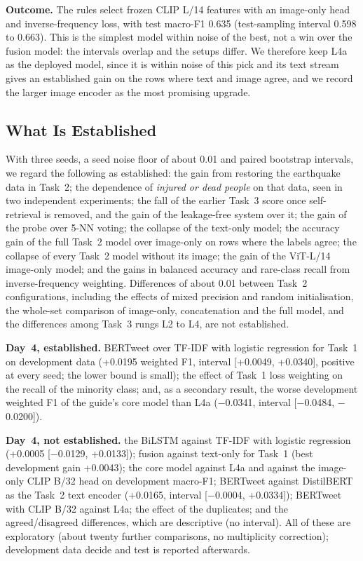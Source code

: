 \documentclass[conference]{IEEEtran}
\begin{document}
\textbf{Outcome.} The rules select frozen CLIP L/14 features with an image-only head and inverse-frequency loss, with test macro-F1 0.635 (test-sampling interval 0.598 to 0.663). This is the simplest model within noise of the best, not a win over the fusion model: the intervals overlap and the setups differ. We therefore keep L4a as the deployed model, since it is within noise of this pick and its text stream gives an established gain on the rows where text and image agree, and we record the larger image encoder as the most promising upgrade.

\subsection{What Is Established}
With three seeds, a seed noise floor of about 0.01 and paired bootstrap intervals, we regard the following as established: the gain from restoring the earthquake data in Task~2; the dependence of \emph{injured or dead people} on that data, seen in two independent experiments; the fall of the earlier Task~3 score once self-retrieval is removed, and the gain of the leakage-free system over it; the gain of the probe over 5-NN voting; the collapse of the text-only model; the accuracy gain of the full Task~2 model over image-only on rows where the labels agree; the collapse of every Task~2 model without its image; the gain of the ViT-L/14 image-only model; and the gains in balanced accuracy and rare-class recall from inverse-frequency weighting. Differences of about 0.01 between Task~2 configurations, including the effects of mixed precision and random initialisation, the whole-set comparison of image-only, concatenation and the full model, and the differences among Task~3 rungs L2 to L4, are not established.

\textbf{Day~4, established.} BERTweet over TF-IDF with logistic regression for Task~1 on development data (+0.0195 weighted F1, interval [+0.0049, +0.0340], positive at every seed; the lower bound is small); the effect of Task~1 loss weighting on the recall of the minority class; and, as a secondary result, the worse development weighted F1 of the guide's core model than L4a ($-$0.0341, interval [$-$0.0484, $-$0.0200]).

\textbf{Day~4, not established.} the BiLSTM against TF-IDF with logistic regression (+0.0005 [$-$0.0129, +0.0133]); fusion against text-only for Task~1 (best development gain +0.0043); the core model against L4a and against the image-only CLIP B/32 head on development macro-F1; BERTweet against DistilBERT as the Task~2 text encoder (+0.0165, interval [$-$0.0004, +0.0334]); BERTweet with CLIP B/32 against L4a; the effect of the duplicates; and the agreed/disagreed differences, which are descriptive (no interval). All of these are exploratory (about twenty further comparisons, no multiplicity correction); development data decide and test is reported afterwards.
\end{document}
